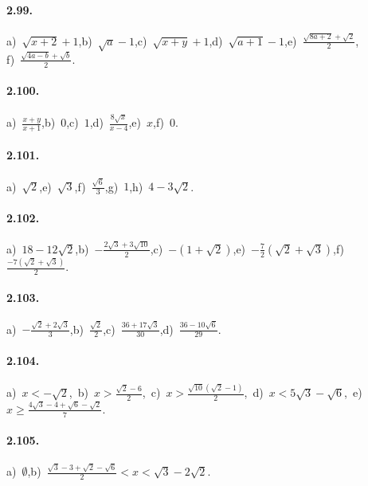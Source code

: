\paragraph{2.99.}
a)~$\sqrt{x+2}+1$,\quad b)~$\sqrt{a}-1$,\quad c)~$\sqrt{x+y}+1$,\quad d)~$\sqrt{a+1}-1$,\quad e)~$\frac{\sqrt{8a+2}+\sqrt{2}}{2}$,\protect\\\quad f)~$\frac{\sqrt{4a-b}+\sqrt{b}}{2}$.

\paragraph{2.100.}
a)~$\frac{x+y}{x+1}$,\quad b)~$0$,\quad c)~$1$,\quad d)~$\frac{8\sqrt{x}}{x-4}$,\quad e)~$x$,\quad f)~$0$.

\paragraph{2.101.}
a)~$\sqrt{2}$,\quad e)~$\sqrt{3}$,\quad f)~$\frac{\sqrt 6} 3$,\quad g)~$1$,\quad h)~$4-3\sqrt 2$.

\paragraph{2.102.}
a)~$18-12\sqrt 2$,\quad b)~$-\frac{2\sqrt 3+3\sqrt{10}} 2$,\quad c)~$-(1+\sqrt 2)$,\quad e)~$-\frac{7}{2}(\sqrt{2}+\sqrt{3})$,\quad f)~$\frac{-7(\sqrt 2+\sqrt 3)} 2$.

\paragraph{2.103.}
a)~$-\frac{\sqrt 2+2\sqrt 3} 3$,\quad b)~$\frac{\sqrt 2} 2$,\quad c)~$\frac{36+17\sqrt 3}{30}$,\quad d)~$\frac{36-10\sqrt 6}{29}$.

\paragraph{2.104.}
a)~$x<-\sqrt 2$,\, b)~$x>\frac{\sqrt 2-6} 2$,\, c)~$x>\frac{\sqrt{10}(\sqrt 2-1)} 2$,\, d)~$x<5\sqrt 3-\sqrt 6$,\, e)~$x\ge \frac{4\sqrt 3-4+\sqrt 6-\sqrt 2} 7$.

\paragraph{2.105.}
a)~$\emptyset$,\quad b)~$\frac{\sqrt 3-3+\sqrt 2-\sqrt 6} 2<x<\sqrt 3-2\sqrt 2$.

